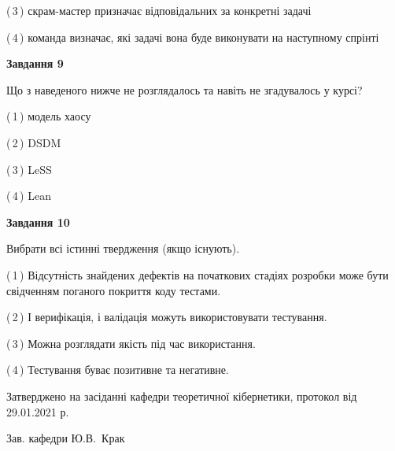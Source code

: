 \documentclass[10pt, ukrainian]{article}
\begin{document}
{\begin {large}
(\,3\,) скрам-мастер призначає відповідальних за конкретні задачі%



(\,4\,) команда визначає, які задачі вона буде виконувати на наступному спрінті%


{\begin {center}\textbf{Завдання 9}\end {center}}\par
Що з наведеного нижче не розглядалось та навіть не згадувалось у курсі?\par
\vspace{2mm}



(\,1\,) модель хаосу%



(\,2\,) DSDM%



(\,3\,) LeSS%



(\,4\,) Lean%


{\begin {center}\textbf{Завдання 10}\end {center}}\par
Вибрати всі істинні твердження (якщо існують).\par
\vspace{2mm}



(\,1\,) Відсутність знайдених дефектів на початкових стадіях розробки може бути свідченням поганого покриття коду тестами.%



(\,2\,) І верифікація, і валідація можуть використовувати тестування.%



(\,3\,) Можна розглядати якість під час використання.%



(\,4\,) Тестування буває позитивне та негативне.%



\end {large}}
{\vspace{5mm}\smallskip \begin {small} Затверджено на засіданні кафедри теоретичної кібернетики, протокол  від   29.01.2021 р.\par\smallskip\smallskip
{\parbox {6.5 cm}{Зав. кафедри \dotfill Ю.В.~Крак}} \end{small}}
\newpage
\end{document}
